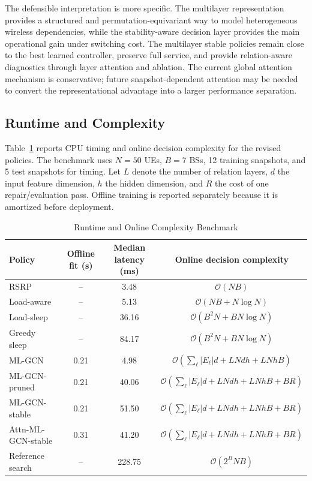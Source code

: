 \documentclass[journal]{IEEEtran}
\begin{document}
The defensible interpretation is more specific. The multilayer representation
provides a structured and permutation-equivariant way to model heterogeneous
wireless dependencies, while the stability-aware decision layer provides the
main operational gain under switching cost. The multilayer stable policies
remain close to the best learned controller, preserve full service, and provide
relation-aware diagnostics through layer attention and ablation. The current
global attention mechanism is conservative; future snapshot-dependent
attention may be needed to convert the representational advantage into a
larger performance separation.

\subsection{Runtime and Complexity}
Table~\ref{tab:runtime_complexity} reports CPU timing and online decision
complexity for the revised policies. The benchmark uses $N=50$ UEs, $B=7$ BSs,
12 training snapshots, and 5 test snapshots for timing. Let $L$ denote the
number of relation layers, $d$ the input feature dimension, $h$ the hidden
dimension, and $R$ the cost of one repair/evaluation pass. Offline training is
reported separately because it is amortized before deployment.

\begin{table}[!t]
\caption{Runtime and Online Complexity Benchmark}
\label{tab:runtime_complexity}
\centering
\small
\begin{tabular}{lccc}
\toprule
Policy & Offline fit (s) & Median latency (ms) & Online decision complexity \\
\midrule
RSRP & -- & 3.48 & $\mathcal{O}(NB)$ \\
Load-aware & -- & 5.13 & $\mathcal{O}(NB+N\log N)$ \\
Load-sleep & -- & 36.16 & $\mathcal{O}(B^{2}N+B N\log N)$ \\
Greedy sleep & -- & 84.17 & $\mathcal{O}(B^{2}N+B N\log N)$ \\
ML-GCN & 0.21 & 4.98 & $\mathcal{O}(\sum_{\ell}|E_{\ell}|d+LNdh+LNhB)$ \\
ML-GCN-pruned & 0.21 & 40.06 & $\mathcal{O}(\sum_{\ell}|E_{\ell}|d+LNdh+LNhB+BR)$ \\
ML-GCN-stable & 0.21 & 51.50 & $\mathcal{O}(\sum_{\ell}|E_{\ell}|d+LNdh+LNhB+BR)$ \\
Attn-ML-GCN-stable & 0.31 & 41.20 & $\mathcal{O}(\sum_{\ell}|E_{\ell}|d+LNdh+LNhB+BR)$ \\
Reference search & -- & 228.75 & $\mathcal{O}(2^{B}NB)$ \\
\bottomrule
\end{tabular}
\end{table}
\end{document}
